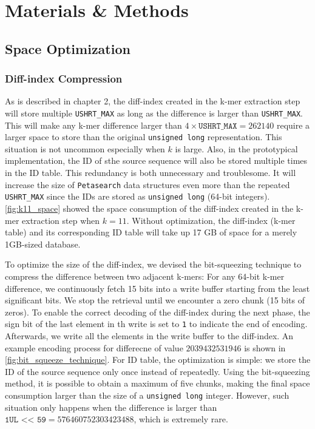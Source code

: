 \chapter{Materials \& Methods}



\section{Space Optimization}

\subsection{Diff-index Compression}

As is described in chapter 2, the diff-index created in the k-mer extraction step will store multiple \texttt{USHRT\_MAX} as long as the difference is larger than \texttt{USHRT\_MAX}. This will make any k-mer difference larger than $4 \times \mathtt{USHRT\_MAX} = 262140$ require a larger space to store than the original \texttt{unsigned long} representation. This situation is not uncommon especially when $k$ is large.
Also, in the prototypical implementation, the ID of sthe source sequence will also be stored multiple times in the ID table. This redundancy is both unnecessary and troublesome. It will increase the size of \texttt{Petasearch} data structures even more than the repeated \texttt{USHRT\_MAX} since the IDs are stored as \texttt{unsigned long} (64-bit integers).
\autoref{fig:k11_space} showed the space consumption of the diff-index created in the k-mer extraction step when $k = 11$. Without optimization, the diff-index (k-mer table) and its corresponding ID table will take up 17 GB of space for a merely 1GB-sized database.

To optimize the size of the diff-index, we devised the bit-squeezing technique to compress the difference between two adjacent k-mers:
For any 64-bit k-mer difference, we continuously fetch 15 bits into a write buffer starting from the least significant bits. We stop the retrieval until we encounter a zero chunk (15 bits of zeros).
To enable the correct decoding of the diff-index during the next phase, the sign bit of the last element in th write is set to \texttt{1} to indicate the end of encoding. Afterwards, we write all the elements in the write buffer to the diff-index. An example encoding process for differecne of value $2039432531946$ is shown in \autoref{fig:bit_squeeze_technique}. For ID table, the optimization is simple: we store the ID of the source sequence only once instead of repeatedly.
Using the bit-squeezing method, it is possible to obtain a maximum of five chunks, making the final space consumption larger than the size of a \texttt{unsigned long} integer. However, such situation only happens when the difference is larger than $\texttt{1UL << 59} = 576460752303423488$, which is extremely rare.


